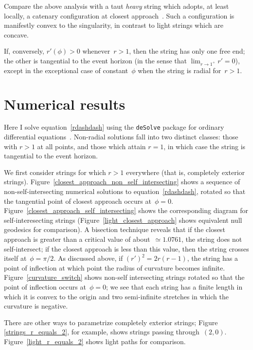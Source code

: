 \documentclass[prb,preprint]{revtex4-1}
\begin{document}
Compare the above analysis with a taut {\em heavy} string which
adopts, at least locally, a catenary configuration at closest
approach~\cite{nguyen2007}.  Such a configuration is manifestly convex
to the singularity, in contrast to light strings which are concave.

If, conversely, $r'(\phi)>0$ whenever~$r>1$, then the string has only
one free end; the other is tangential to the event horizon (in the
sense that ${\displaystyle \lim_{r\longrightarrow 1^+}r'=0}$), except
in the exceptional case of constant~$\phi$ when the string is radial
for~$r>1$.

\section{Numerical results}

Here I solve equation~\ref{rdashdash} using the \verb+deSolve+ package
for ordinary differential equations~\cite{soetart2010}.  Non-radial
solutions fall into two distinct classes: those with $r>1$ at all
points, and those which attain $r=1$, in which case the string is
tangential to the event horizon.

We first consider strings for which $r>1$ everywhere (that is,
completely exterior strings).
Figure~\ref{closest_approach_non_self_intersecting} shows a sequence
of non-self-intersecting numerical solutions to
equation~\ref{rdashdash}, rotated so that the tangential point of
closest approach occurs at~$\phi=0$.
Figure~\ref{closest_approach_self_intersecting} shows the
corresponding diagram for self-interesecting strings
(Figure~\ref{light_closest_approach} shows equivalent null geodesics
for comparison).  A bisection technique reveals that if the closest
approach is greater than a critical value of about~$\simeq 1.0761$,
the string does not self-intersect; if the closest approach is less
than this value, then the string crosses itself at~$\phi=\pi/2$.  As
discussed above, if $\left(r'\right)^2=2r(r-1)$, the string has a
point of inflection at which point the radius of curvature becomes
infinite.  Figure~\ref{curvature_switch} shows non-self intersecting
strings rotated so that the point of inflection occurs at~$\phi=0$; we
see that each string has a finite length in which it is convex to the
origin and two semi-infinite stretches in which the curvature is
negative.

There are other ways to parametrize completely exterior strings;
Figure \ref{strings_r_equals_2}, for example, shows strings passing
through~$(2,0)$.  Figure~\ref{light_r_equals_2} shows light paths for
comparison.
\end{document}
